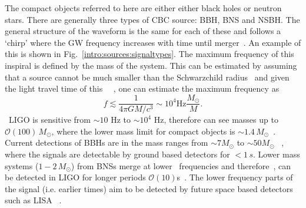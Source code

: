 The compact objects referred to here are either either black holes or neutron
stars.  There are generally three types of \gls{CBC} source: \gls{BBH},
\gls{BNS} and \gls{NSBH}.  The general structure of the waveform is the same
for each of these and follows a `chirp' where the \gls{GW} frequency increases
with time until merger~. An example of this is shown in
Fig.~\ref{intro:sources:signaltypes}.  The maximum frequency of this inspiral
is defined by the mass of the system.  This can be estimated by assuming that a
source cannot be much smaller than the Schwarzchild radius~ and given the light
travel time of this~ \citep{g2000NeutrinosPhysics}~, one can estimate the maximum
frequency as~
\begin{equation}
    f \lesssim \frac{1}{4 \pi G M/ c^3}  \sim 10^{4} \mathrm{Hz} \frac{M_{\odot}}{M} .
\end{equation}
~\gls{LIGO} is sensitive from $\sim 10$ Hz to $\sim
10^4$ Hz, therefore can see masses up to $\mathcal{O}(100)\, M_{\odot}$, where
the lower mass limit for compact objects is $\sim 1.4\, M_{\odot}$~. Current detections of \glspl{BBH} are in the mass
ranges from $\sim 7M_{\odot}$ to $\sim 50M_{\odot}$
\citep{ligoscientificcollaborationandvirgocollaboration2019GWTC1GravitationalWave}~, where the signals are detectable by ground based detectors for $<
1\,s$.  Lower mass systems ($1-2\,M_{\odot}$) from \glspl{BNS} merge at
lower~ frequencies and therefore~, can be detected in \gls{LIGO} for
longer periods $\mathcal{O}(10)$s~.  The lower frequency parts of the signal (i.e. earlier
times) aim to be detected by future space based detectors such as \gls{LISA}
\citep{danzmann1996LISALaser}~.

